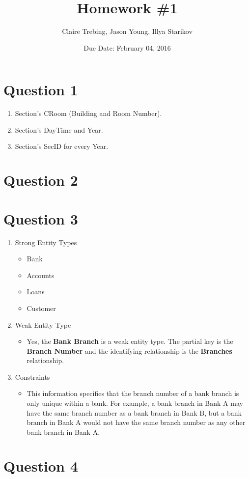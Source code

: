 \documentclass{article}
\begin{document}
\title{Homework \#1}
\author{Claire Trebing, Jason Young, Illya Starikov}
\date{Due Date: February 04, 2016}

\maketitle

\section*{Question 1}
\begin{enumerate}[label=\alph*]
\item Section's CRoom (Building and Room Number).
\item Section's DayTime and Year.
\item Section's SecID for every Year.
\end{enumerate}

\section*{Question 2}
\begin{center}

\end{center}


\section*{Question 3}
\begin{enumerate}[label=\alph*]
\item Strong Entity Types
    \begin{itemize}
    \item Bank
    \item Accounts
    \item Loans
    \item Customer
    \end{itemize}
\item Weak Entity Type
    \begin{itemize}
    \item Yes, the \textbf{Bank Branch} is a weak entity type. The partial key is the \textbf{Branch Number} and the identifying relationship is the \textbf{Branches} relationship.
    \end{itemize}
\item Constraints
    \begin{itemize}
    \item This information specifies that the branch number of a bank branch is only unique within a bank. For example, a bank branch in Bank A may have the same branch number as a bank branch in Bank B, but a bank branch in Bank A would not have the same branch number as any other bank branch in Bank A.
    \end{itemize}
\end{enumerate}

\section*{Question 4}

\end{document}
